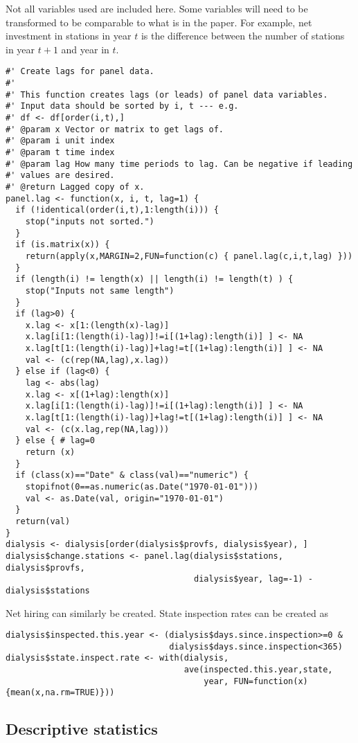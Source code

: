 \documentclass[11pt,reqno,letter]{article}
\renewcommand{\cite}{\citet}
\theoremstyle{definition}
\theoremstyle{problem}
\begin{document}
Not all variables used \cite{grieco2017} are included here. Some
variables will need to be transformed to be comparable to what is in
the paper. For example, net investment in stations in year $t$ is the
difference between the number of stations in year $t+1$ and year in
$t$.
\begin{lstlisting}
#' Create lags for panel data.
#'
#' This function creates lags (or leads) of panel data variables.
#' Input data should be sorted by i, t --- e.g.
#' df <- df[order(i,t),]
#' @param x Vector or matrix to get lags of.
#' @param i unit index
#' @param t time index
#' @param lag How many time periods to lag. Can be negative if leading
#' values are desired.
#' @return Lagged copy of x.
panel.lag <- function(x, i, t, lag=1) {
  if (!identical(order(i,t),1:length(i))) {
    stop("inputs not sorted.")
  }
  if (is.matrix(x)) {
    return(apply(x,MARGIN=2,FUN=function(c) { panel.lag(c,i,t,lag) }))
  }
  if (length(i) != length(x) || length(i) != length(t) ) {
    stop("Inputs not same length")
  }
  if (lag>0) {
    x.lag <- x[1:(length(x)-lag)]
    x.lag[i[1:(length(i)-lag)]!=i[(1+lag):length(i)] ] <- NA
    x.lag[t[1:(length(i)-lag)]+lag!=t[(1+lag):length(i)] ] <- NA
    val <- (c(rep(NA,lag),x.lag))
  } else if (lag<0) {
    lag <- abs(lag)
    x.lag <- x[(1+lag):length(x)]
    x.lag[i[1:(length(i)-lag)]!=i[(1+lag):length(i)] ] <- NA
    x.lag[t[1:(length(i)-lag)]+lag!=t[(1+lag):length(i)] ] <- NA
    val <- (c(x.lag,rep(NA,lag)))
  } else { # lag=0
    return (x)
  }
  if (class(x)=="Date" & class(val)=="numeric") {
    stopifnot(0==as.numeric(as.Date("1970-01-01")))
    val <- as.Date(val, origin="1970-01-01")
  }
  return(val)
}
dialysis <- dialysis[order(dialysis$provfs, dialysis$year), ]
dialysis$change.stations <- panel.lag(dialysis$stations, dialysis$provfs,
                                      dialysis$year, lag=-1) - dialysis$stations
\end{lstlisting}  
Net hiring can similarly be created. State inspection rates can be
created as
\begin{lstlisting}
dialysis$inspected.this.year <- (dialysis$days.since.inspection>=0 &
                                 dialysis$days.since.inspection<365)
dialysis$state.inspect.rate <- with(dialysis,
                                    ave(inspected.this.year,state,
                                        year, FUN=function(x) {mean(x,na.rm=TRUE)}))
\end{lstlisting}

\clearpage

\subsection{Descriptive statistics}
\end{document}
